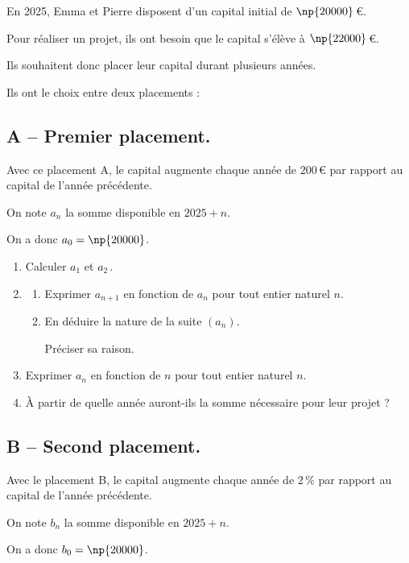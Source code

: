 En 2025, Emma et Pierre disposent d'un capital initial de $\np{20000} $\,\euro{}.

	Pour réaliser un projet, ils ont besoin que le capital s'élève à $\np{22000} $\,\euro{}.

	Ils souhaitent donc placer leur capital durant plusieurs années.

	Ils ont le choix entre deux placements :

	\subsection*{A -- Premier placement.}
	Avec ce placement A, le capital augmente chaque année de $200 $\,\euro{} par rapport au capital de l'année précédente.

	On note $a_{n}$ la somme disponible en $2025+n$.

	On a donc $a_{0}=\np{20000}$.

	\begin{enumerate}
		\item Calculer $a_{1}$ et $a_{2}$\,.
		\item \begin{enumerate}
			\item Exprimer $a_{n+1}$ en fonction de $a_{n}$ pour tout entier naturel $n$.

			\item En déduire la nature de la suite $\left(a_{n}\right)$.

			Préciser sa raison.
		\end{enumerate}

		\item Exprimer $a_{n}$ en fonction de $n$ pour tout entier naturel $n$.

		\item À partir de quelle année auront-ils la somme nécessaire pour leur projet ?
	\end{enumerate}

	\subsection*{B -- Second placement.}
	Avec le placement B, le capital augmente chaque année de $2\,\%$ par rapport au capital de l'année précédente.

	On note $b_{n}$ la somme disponible en $2025+n$.

	On a donc $b_{0}=\np{20000}$.

